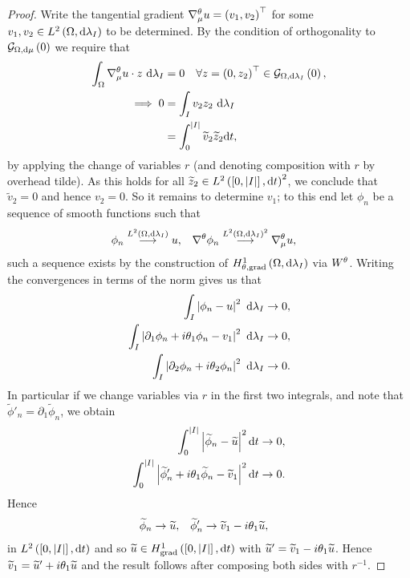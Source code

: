 \begin{proof}
	Write the tangential gradient $\nabla_\mu^\theta u = \left( v_1, v_2 \right)^\top$ for some $v_1,v_2\in L^{2}\left( \Omega,\mathrm{d}\lambda_I \right)$ to be determined.
	By the condition of orthogonality to $\mathcal{G}_{ \Omega, \mathrm{d}\mu}\left( 0 \right)$ we require that
	\begin{align*}
		\int_{\Omega}\nabla_\mu^\theta u \cdot z \ \mathrm{d}\lambda_I &= 0 \quad \forall z=\left( 0,z_2 \right)^\top\in\mathcal{G}_{ \Omega, \mathrm{d}\lambda_I}\left( 0 \right), \\
		\implies 0 &= \int_{I}v_2 z_2 \ \mathrm{d}\lambda_I \\
		&= \int_0^{\left\lvert I \right\rvert}\widetilde{v}_2\widetilde{z}_2 \mathrm{d} t,
	\end{align*}
	by applying the change of variables $r$ (and denoting composition with $r$ by overhead tilde).
	As this holds for all $\widetilde{z}_2\in L^{2}\left( \left[ 0,\left\lvert I \right\rvert \right],\mathrm{d}t \right)^2$, we conclude that $\widetilde{v}_2=0$ and hence $v_2=0$.
	So it remains to determine $v_1$; to this end let $\phi_n$ be a sequence of smooth functions such that
	\begin{align*}
		\phi_n \overset{L^{2}\left( \Omega,\mathrm{d}\lambda_I \right)}{\longrightarrow} u, &\quad \nabla^\theta \phi_n \overset{L^{2}\left( \Omega,\mathrm{d}\lambda_I \right)^2}{\longrightarrow} \nabla_\mu^\theta u,
	\end{align*}
	such a sequence exists by the construction of $H^1_{\theta, \mathrm{grad}}\left( \Omega, \mathrm{d}\lambda_I \right)$ via $W^\theta$.
	Writing the convergences in terms of the norm gives us that
	\begin{align*}
		\int_{I}\left\lvert \phi_n - u \right\rvert^2 \ \mathrm{d}\lambda_I &\rightarrow 0, \\
		\int_{I}\left\lvert \partial_1\phi_n + i\theta_1\phi_n - v_1 \right\rvert^2 \ \mathrm{d}\lambda_I &\rightarrow 0, \\
		\int_{I}\left\lvert \partial_2\phi_n + i\theta_2\phi_n \right\rvert^2 \ \mathrm{d}\lambda_I &\rightarrow 0.	
	\end{align*}
	In particular if we change variables via $r$ in the first two integrals, and note that $\widetilde{\phi}'_n = \partial_1\widetilde{\phi}_n$, we obtain
	\begin{align*}
		\int_0^{\left\lvert I \right\rvert}\left\lvert \widetilde{\phi}_n - \widetilde{u} \right\rvert^2 \mathrm{d} t \rightarrow 0, \\
		\int_0^{\left\lvert I \right\rvert}\left\lvert \widetilde{\phi}'_n + i\theta_1\widetilde{\phi}_n - \widetilde{v}_1  \right\rvert^2 \mathrm{d} t \rightarrow 0.
	\end{align*}
	Hence
	\begin{align*}
		\widetilde{\phi}_n \rightarrow \widetilde{u}, &\quad \widetilde{\phi}'_n \rightarrow \widetilde{v}_1 - i\theta_1\widetilde{u},
	\end{align*}
	in $L^{2}\left( \left[ 0,\left\lvert I \right\rvert \right],\mathrm{d}t \right)$ and so $\widetilde{u}\in H^1_\mathrm{grad}\left( \left[ 0,\left\lvert I \right\rvert \right], \mathrm{d}t \right)$ with $\widetilde{u}' = \widetilde{v}_1 - i\theta_1\widetilde{u}$.
	Hence $\widetilde{v}_1 = \widetilde{u}' + i\theta_1\widetilde{u}$ and the result follows after composing both sides with $r^{-1}$.
\end{proof}

